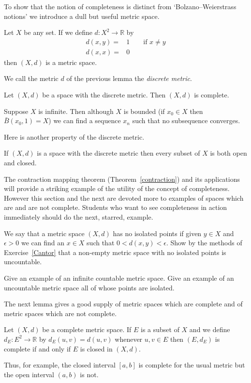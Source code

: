 To show that the notion of completeness is distinct
from `Bolzano--Weierstrass notions' we introduce a dull but
useful metric space.
\begin{lemma} Let $X$ be any set. If we define
$d:X^{2}\rightarrow\mathbb{R}$ by
\begin{align*}
d(x,y)=&1\qquad\text{if $x\neq y$}\\
d(x,x)=&0
\end{align*}
then  $(X,d)$ is a metric space.
\end{lemma}
We call the metric $d$ of the previous lemma the
\emph{discrete metric}.
\begin{lemma} Let $(X,d)$ be a space with the discrete
metric. Then $(X,d)$ is complete.

Suppose $X$ is infinite. Then although $X$ is bounded
(if $x_{0}\in X$ then $\bar{B}(x_{0},1)=X$)
we can find a sequence $x_{n}$ such that no subsequence converges.
\end{lemma}
Here is another property of the discrete metric.
\begin{lemma} If $(X,d)$ is a space with the discrete
metric then every subset of $X$ is both open and closed.
\end{lemma}

The contraction mapping theorem (Theorem~\ref{contraction})
and its applications will provide a striking example
of the utility of the concept of completeness. However this section
and the next are devoted more to examples of spaces
which are and are not complete. Students
who want to see completeness in action immediately
should do the next, starred, example.

\begin{exercise}
We say that a metric space $(X,d)$ has no isolated points
if given $y\in X$ and $\epsilon>0$ we can find
an $x\in X$ such that $0<d(x,y)<\epsilon$. Show
by the methods of Exercise~\ref{Cantor} that
a non-empty metric space with no isolated points
is uncountable.

Give an example of an infinite countable metric space.
Give an example of an uncountable metric space
all of whose points are isolated.
\end{exercise}

The next lemma gives a good supply of metric spaces
which are complete and of metric spaces
which are not complete. 
\begin{lemma}\label{closed complete}
Let $(X,d)$ be a complete metric space.
If $E$ is a subset of $X$ and we define 
$d_{E}:E^{2}\rightarrow{\mathbb R}$
by $d_{E}(u,v)=d(u,v)$ whenever $u,v\in E$
then $(E,d_{E})$ is complete if and only if
$E$ is closed in $(X,d)$.
\end{lemma}
Thus, for example, the closed interval $[a,b]$
is complete for the usual metric but the
open interval $(a,b)$ is not.

